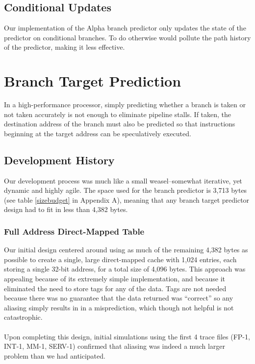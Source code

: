 \documentclass[twocolumn]{article}
\begin{document}
\subsection{Conditional Updates}
Our implementation of the Alpha branch predictor only updates the state of the predictor on conditional branches. To do otherwise would pollute the path history of the predictor, making it less effective. 
\section{Branch Target Prediction}
In a high-performance processor, simply predicting whether a branch is taken or not taken accurately is not enough to eliminate pipeline stalls.  If taken, the destination address of the branch must also be predicted so that instructions beginning at the target address can be speculatively executed. 
 
\subsection{Development History}
Our development process was much like a small weasel--somewhat iterative, yet dynamic and highly agile.  The space used for the branch predictor is 3,713 bytes (see table \ref{sizebudget} in Appendix A), meaning that any branch target predictor design had to fit in less than 4,382 bytes.
\subsubsection{Full Address Direct-Mapped Table}
Our initial design centered around using as much of the remaining 4,382 bytes as possible to create a single, large direct-mapped cache with 1,024 entries, each storing a single 32-bit address, for a total size of 4,096 bytes.  This approach was appealing because of its extremely simple implementation, and because it eliminated the need to store tags for any of the data.  Tags are not needed because there was no guarantee that the data returned was ``correct'' so any aliasing simply results in in a misprediction, which though not helpful is not catastrophic. \\\\
Upon completing this design, initial simulations using the first 4 trace files (FP-1, INT-1, MM-1, SERV-1) confirmed that aliasing was indeed a much larger problem than we had anticipated.
\end{document}
